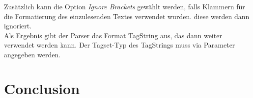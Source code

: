 Zusätzlich kann die Option \textit{\glqq Ignore Brackets \grqq{}} gewählt werden, falls Klammern für die Formatierung des einzulesenden Textes verwendet wurden. diese werden dann ignoriert.
\\
Als Ergebnis gibt der Parser das Format TagString aus, das dann weiter verwendet werden kann. Der Tagset-Typ des TagStrings muss via Parameter angegeben werden.







\section{Conclusion}
\label{sec:system:conclusion}


